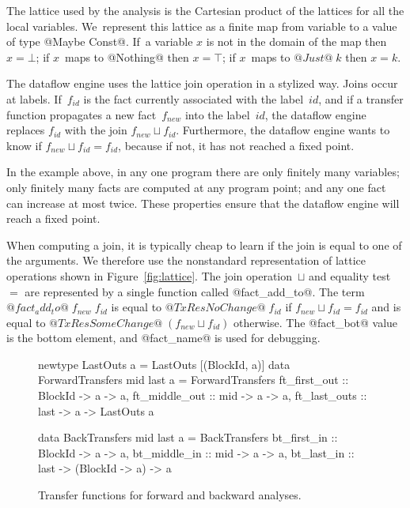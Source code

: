 \documentclass[blockstyle,preprint,natbib,nocopyrightspace]{sigplanconf}
\newcommand\join{\sqcup}
\newcommand\figref[1]{Figure~\ref{fig:#1}}
\newcommand\figlabel[1]{\label{fig:#1}}
\begin{document}
The lattice  used by the analysis is the Cartesian product of the
lattices for all the local variables.
We~represent this lattice as a finite map from variable
to a value of type @Maybe Const@.
If~a variable $x$ is not in the domain of the map then $x=\bot$;
if $x$~maps to @Nothing@ then $x=\top$; if $x$~maps to $@Just@\;k$ then
$x=k$.


The dataflow engine uses the lattice join operation in a stylized way.
Joins occur at labels.
If~$f_{\mathit{id}}$ is the fact currently associated with the
label~$\mathit{id}$, 
and if a transfer function propagates a new fact~$f_{\mathit{new}}$
into the label~$\mathit{id}$, 
the dataflow engine replaces $f_{\mathit{id}}$ with
the join  $f_{\mathit{new}} \join f_{\mathit{id}}$.
Furthermore, the dataflow engine wants to know if
  $f_{\mathit{new}} \join f_{\mathit{id}} = f_{\mathit{id}}$,
because if not, it has not reached a fixed point.

In the example above, in any one program there are only finitely many variables;
only finitely many facts are computed at any program point;
and any one fact can increase at most twice.
These properties
ensure that the dataflow engine will
reach a fixed point.



When computing a join, 
it is typically cheap to learn if the join
is equal to one of the arguments.
We therefore use the nonstandard representation of lattice operations
shown in \figref{lattice}.
The join operation~$\join$ and equality test~$=$ are represented by a
single function called @fact_add_to@.
The term $@fact_add_to@\;f_{\mathit{new}}\;f_{\mathit{id}}$ is equal to
$@TxRes NoChange@\; f_{\mathit{id}}$ if $f_{\mathit{new}} \join f_{\mathit{id}} = f_{\mathit{id}}$
and is equal to
$@TxRes SomeChange@\; (f_{\mathit{new}} \join f_{\mathit{id}})$ otherwise.
The @fact_bot@ value is the bottom element, 
and @fact_name@  is used for debugging.

\begin{figure}
\begin{code}
newtype LastOuts a = LastOuts [(BlockId, a)]
data ForwardTransfers mid last a = ForwardTransfers
 {ft_first_out  :: BlockId -> a -> a,
  ft_middle_out :: mid     -> a -> a,
  ft_last_outs  :: last    -> a -> LastOuts a} 

data BackTransfers mid last a = BackTransfers
 {bt_first_in  :: BlockId -> a              -> a,
  bt_middle_in :: mid     -> a              -> a,
  bt_last_in   :: last    -> (BlockId -> a) -> a} 
\end{code}
\caption{Transfer functions for forward and backward analyses.}
\figlabel{transfers}
%
%
\end{figure}
\end{document}
